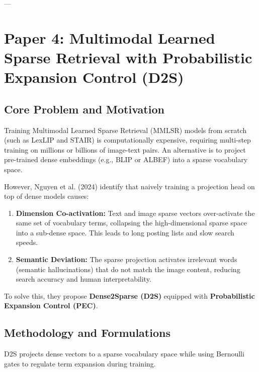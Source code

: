 \documentclass[11pt,a4paper]{article}
\begin{document}
---

\section{Paper 4: Multimodal Learned Sparse Retrieval with Probabilistic Expansion Control (D2S)}
\label{sec:d2s}

\subsection{Core Problem and Motivation}
Training Multimodal Learned Sparse Retrieval (MMLSR) models from scratch (such as LexLIP and STAIR) is computationally expensive, requiring multi-step training on millions or billions of image-text pairs. An alternative is to project pre-trained dense embeddings (e.g., BLIP or ALBEF) into a sparse vocabulary space. 

However, Nguyen et al. (2024) identify that naively training a projection head on top of dense models causes:
\begin{enumerate}
    \item \textbf{Dimension Co-activation:} Text and image sparse vectors over-activate the same set of vocabulary terms, collapsing the high-dimensional sparse space into a sub-dense space. This leads to long posting lists and slow search speeds.
    \item \textbf{Semantic Deviation:} The sparse projection activates irrelevant words (semantic hallucinations) that do not match the image content, reducing search accuracy and human interpretability.
\end{enumerate}
To solve this, they propose \textbf{Dense2Sparse (D2S)} equipped with \textbf{Probabilistic Expansion Control (PEC)}.

\subsection{Methodology and Formulations}
D2S projects dense vectors to a sparse vocabulary space while using Bernoulli gates to regulate term expansion during training.
\end{document}
